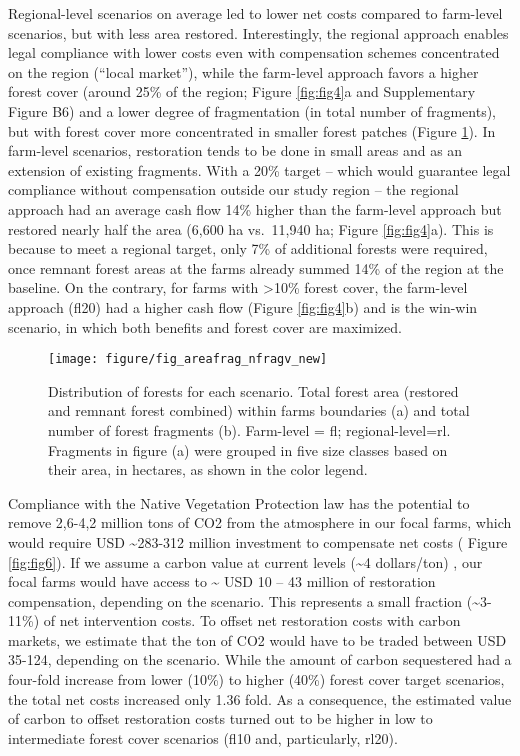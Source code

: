 \documentclass[
	12pt,				%
	oneside,			%
	a4paper,			%
	chapter=TITLE,		%
	section=TITLE,		%
	brazil,			%
	english				%
	]{abntex2}
\begin{document}
Regional-level scenarios on average led to lower net costs compared to farm-level scenarios, but with less area restored. Interestingly, the regional approach enables legal compliance with lower costs even with compensation schemes concentrated on the region (``local market''), while the farm-level approach favors a higher forest cover (around 25\% of the region; Figure \ref{fig:fig4}a and Supplementary Figure B6) and a lower degree of fragmentation (in total number of fragments), but with forest cover more concentrated in smaller forest patches (Figure \ref{fig:fig5}). In farm-level scenarios, restoration tends to be done in small areas and as an extension of existing fragments. With a 20\% target -- which would guarantee legal compliance without compensation outside our study region -- the regional approach had an average cash flow 14\% higher than the farm-level approach but restored nearly half the area (6,600 ha vs.~11,940 ha; Figure \ref{fig:fig4}a). This is because to meet a regional target, only 7\% of additional forests were required, once remnant forest areas at the farms already summed 14\% of the region at the baseline. On the contrary, for farms with \textgreater10\% forest cover, the farm-level approach (fl20) had a higher cash flow (Figure \ref{fig:fig4}b) and is the win-win scenario, in which both benefits and forest cover are maximized.
\begin{figure}[H]

{\centering \texttt{[image: figure/fig\_areafrag\_nfragv\_new]} 

}

\caption{Distribution of forests for each scenario. Total forest area (restored and remnant forest combined) within farms boundaries (a) and total number of forest fragments (b). Farm-level = fl; regional-level=rl. Fragments in figure (a) were grouped in five size classes based on their area, in hectares, as shown in the color legend. }\label{fig:fig5}
\end{figure}
Compliance with the Native Vegetation Protection law has the potential to remove 2,6-4,2 million tons of CO2 from the atmosphere in our focal farms, which would require USD \textasciitilde283-312 million investment to compensate net costs ( Figure \ref{fig:fig6}). If we assume a carbon value at current levels (\textasciitilde4 dollars/ton) \autocite{donofrio_voluntary_2020}, our focal farms would have access to \textasciitilde{} USD 10 -- 43 million of restoration compensation, depending on the scenario. This represents a small fraction (\textasciitilde3-11\%) of net intervention costs. To offset net restoration costs with carbon markets, we estimate that the ton of CO2 would have to be traded between USD 35-124, depending on the scenario. While the amount of carbon sequestered had a four-fold increase from lower (10\%) to higher (40\%) forest cover target scenarios, the total net costs increased only 1.36 fold. As a consequence, the estimated value of carbon to offset restoration costs turned out to be higher in low to intermediate forest cover scenarios (fl10 and, particularly, rl20).
\end{document}

